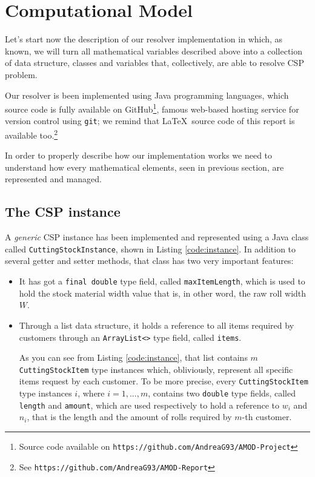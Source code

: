 \documentclass[10pt,a4paper]{article}
\begin{document}
\clearpage
\newpage
\section{Computational Model}

Let's start now the description of our resolver implementation in which, as known, we will turn all mathematical variables described above into a collection of data structure, classes and variables that, collectively, are able to resolve CSP problem.

Our resolver is been implemented using Java programming languages, which source code is fully available on GitHub\footnote{Source code available on \texttt{https://github.com/AndreaG93/AMOD-Project}}, famous web-based hosting service for version control using \texttt{git}; we remind that \LaTeX\ source code of this report is available too.\footnote{See \texttt{https://github.com/AndreaG93/AMOD-Report}}

In order to properly describe how our implementation works we need to understand how every mathematical elements, seen in previous section, are represented and managed.

\subsection{The CSP instance}

A \textit{generic} CSP instance has been implemented and represented using a Java class called \texttt{CuttingStockInstance}, shown in Listing \ref{code:instance}. In addition to several getter and setter methods, that class has two very important features: 

\begin{itemize}
\item It has got a \texttt{final double} type field, called \texttt{maxItemLength}, which is used to hold the stock material width value that is, in other word, the raw roll width $W$.

\item Through a list data structure, it holds a reference to all items required by customers through an \texttt{ArrayList<>} type field, called \texttt{items}. 

As you can see from Listing \ref{code:instance}, that list contains $m$ \texttt{CuttingStockItem} type instances which, obliviously, represent all specific items request by each customer. To be more precise, every \texttt{CuttingStockItem} type instances $i$, where $i = 1,...,m$, contains two \texttt{double} type fields, called \texttt{length} and \texttt{amount}, which are used respectively to hold a reference to $w_i$ and $n_i$, that is the length and the amount of rolls required by $m$-th customer. 
\end{itemize}
\end{document}
